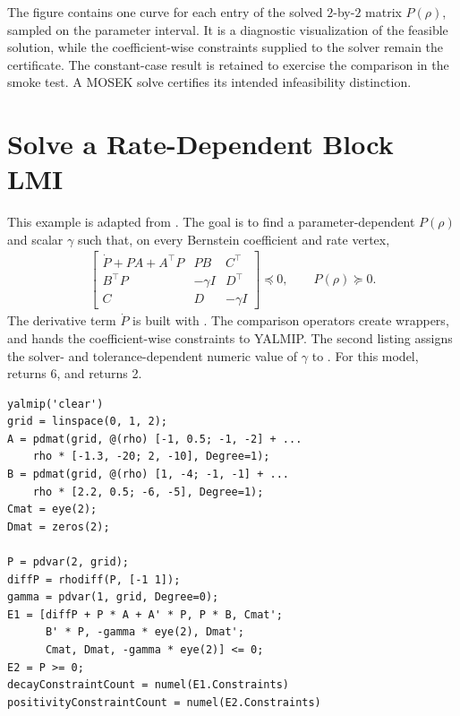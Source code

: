 The figure contains one curve for each entry of the solved $2$-by-$2$ matrix $P(\rho)$, sampled on the parameter interval. It is a diagnostic visualization of the feasible solution, while the coefficient-wise constraints supplied to the solver remain the certificate. The constant-case result is retained to exercise the comparison in the smoke test. A MOSEK solve certifies its intended infeasibility distinction.

\section{Solve a Rate-Dependent Block LMI}
\label{sec:solver-example}

This example is adapted from .  The goal is to find a parameter-dependent $P(\rho)$ and scalar $\gamma$ such that, on every Bernstein coefficient and rate vertex,
\begin{gather*}
\begin{bmatrix}
\dot P + PA + A^\top P & PB & C^\top \\
B^\top P & -\gamma I & D^\top \\
C & D & -\gamma I
\end{bmatrix}
\preceq 0,
\qquad
P(\rho)\succeq 0.
\end{gather*}
The derivative term $\dot P$ is built with .  The comparison operators create  wrappers, and  hands the coefficient-wise constraints to YALMIP.  The second listing assigns the solver- and tolerance-dependent numeric value of $\gamma$ to .  For this model,  returns 6, and  returns 2.

\begin{lstlisting}[style=dpmatlab]
yalmip('clear')
grid = linspace(0, 1, 2);
A = pdmat(grid, @(rho) [-1, 0.5; -1, -2] + ...
    rho * [-1.3, -20; 2, -10], Degree=1);
B = pdmat(grid, @(rho) [1, -4; -1, -1] + ...
    rho * [2.2, 0.5; -6, -5], Degree=1);
Cmat = eye(2);
Dmat = zeros(2);

P = pdvar(2, grid);
diffP = rhodiff(P, [-1 1]);
gamma = pdvar(1, grid, Degree=0);
E1 = [diffP + P * A + A' * P, P * B, Cmat';
      B' * P, -gamma * eye(2), Dmat';
      Cmat, Dmat, -gamma * eye(2)] <= 0;
E2 = P >= 0;
decayConstraintCount = numel(E1.Constraints)
positivityConstraintCount = numel(E2.Constraints)
\end{lstlisting}

